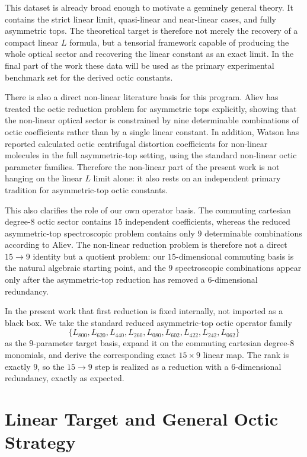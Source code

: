 \documentclass[aip,jcp,reprint,floatfix]{revtex4-2}
\begin{document}
This dataset is already broad enough to motivate a genuinely general theory. It
contains the strict linear limit, quasi-linear and near-linear cases, and
fully asymmetric tops. The theoretical target is therefore not merely the
recovery of a compact linear \(L\) formula, but a tensorial framework capable
of producing the whole optical sector and recovering the linear constant as an
exact limit. In the final part of the work these data will be used as the
primary experimental benchmark set for the derived octic constants.

There is also a direct non-linear literature basis for this program. Aliev has
treated the octic reduction problem for asymmetric tops explicitly, showing
that the non-linear optical sector is constrained by nine determinable
combinations of octic coefficients rather than by a single linear
constant.\cite{Aliev1983} In addition, Watson has reported calculated octic
centrifugal distortion coefficients for non-linear molecules in the full
asymmetric-top setting, using the standard non-linear octic parameter
families.\cite{Watson2006} Therefore the non-linear part of the present work is
not hanging on the linear \(L\) limit alone: it also rests on an independent
primary tradition for asymmetric-top octic constants.

This also clarifies the role of our own operator basis. The commuting cartesian
degree-8 octic sector contains \(15\) independent coefficients, whereas the
reduced asymmetric-top spectroscopic problem contains only \(9\) determinable
combinations according to Aliev.\cite{Aliev1983} The non-linear reduction
problem is therefore not a direct \(15\to 9\) identity but a quotient problem:
our \(15\)-dimensional commuting basis is the natural algebraic starting point,
and the \(9\) spectroscopic combinations appear only after the asymmetric-top
reduction has removed a \(6\)-dimensional redundancy.

In the present work that first reduction is fixed internally, not imported as a
black box. We take the standard reduced asymmetric-top octic operator family
\[
\{L_{800},L_{620},L_{440},L_{260},L_{080},L_{602},L_{422},L_{242},L_{062}\}
\]
as the \(9\)-parameter target basis, expand it on the commuting cartesian
degree-8 monomials, and derive the corresponding exact \(15\times 9\) linear
map. The rank is exactly \(9\), so the \(15\to 9\) step is realized as a
reduction with a \(6\)-dimensional redundancy, exactly as expected.

\section{Linear Target and General Octic Strategy}
\end{document}
